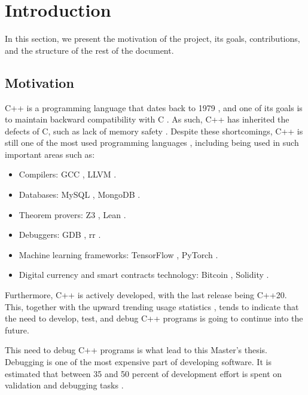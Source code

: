 \chapter{Introduction}
\label{cap:introduccion}


In this section, we present the motivation of the project, its goals, contributions, and the structure of the rest of the document.

\section{Motivation}
C++ is a programming language that dates back to 1979 \cite{cppHistory}, and one of its goals is to maintain backward compatibility with C \cite{cCompat}. As such, C++ has inherited the defects of C, such as lack of memory safety \cite{practicalmemorysafety}.
Despite these shortcomings, C++ is still one of the most used programming languages \cite{popularityPL}, including being used in such important areas such as:
\begin{itemize}
    \item Compilers: GCC \cite{gcc}, LLVM \cite{llvm}.
    \item Databases: MySQL \cite{mysql}, MongoDB \cite{mongodb}.
    \item Theorem provers: Z3 \cite{z3}, Lean \cite{lean}.
    \item Debuggers: GDB \cite{gdb}, rr \cite{rr}.
    \item Machine learning frameworks: TensorFlow \cite{tensorflow}, PyTorch \cite{pytorch}.
    \item Digital currency and smart contracts technology: Bitcoin \cite{bitcoin}, Solidity \cite{solidity}.
\end{itemize}

Furthermore, C++ is actively developed, with the last release being C++20. This, together with the upward trending usage statistics \cite{popularityPL}, tends to indicate that the need to develop, test, and debug C++ programs is going to continue into the future.

This need to debug C++ programs is what lead to this Master's thesis.
Debugging is one of the most expensive part of developing software.
It is estimated that between 35 and 50 percent of development effort is spent on validation and debugging tasks \cite{debuggingMindset}.

